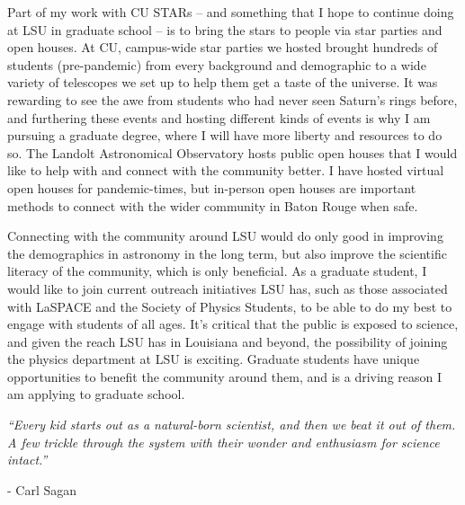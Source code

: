 \documentclass[12pt,letterpaper]{article}
\begin{document}
Part of my work with CU STARs -- and something that I hope to continue doing at LSU in graduate school -- is to bring the stars to people via star parties and open houses. At CU, campus-wide star parties we hosted brought hundreds of students (pre-pandemic) from every background and demographic to a wide variety of telescopes we set up to help them get a taste of the universe. It was rewarding to see the awe from students who had never seen Saturn's rings before, and furthering these events and hosting different kinds of events is why I am pursuing a graduate degree, where I will have more liberty and resources to do so. The Landolt Astronomical Observatory hosts public open houses that I would like to help with and connect with the community better. I have hosted virtual open houses for pandemic-times, but in-person open houses are important methods to connect with the wider community in Baton Rouge when safe.

Connecting with the community around LSU would do only good in improving the demographics in astronomy in the long term, but also improve the scientific literacy of the community, which is only beneficial. As a graduate student, I would like to join current outreach initiatives LSU has, such as those associated with LaSPACE and the Society of Physics Students, to be able to do my best to engage with students of all ages. It's critical that the public is exposed to science, and given the reach LSU has in Louisiana and beyond, the possibility of joining the physics department at LSU is exciting. Graduate students have unique opportunities to benefit the community around them, and is a driving reason I am applying to graduate school.

\textit{“Every kid starts out as a natural-born scientist, and then we beat it out of them. A few trickle through the system with their wonder and enthusiasm for science intact.”}

- Carl Sagan
\end{document}
